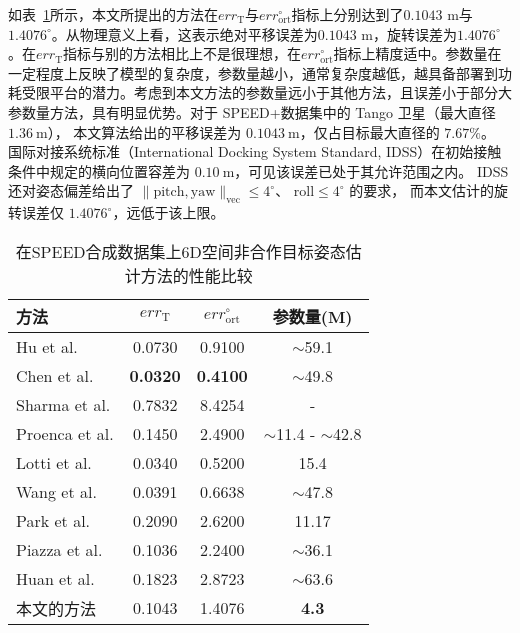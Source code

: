 如表~\ref{tab:SPEED_Comparison}所示，本文所提出的方法在$err_{\text{T}}$与$err_{\text{ort}}^{\circ}$指标上分别达到了$0.1043 \text{ m}$与$1.4076^{\circ}$。从物理意义上看，这表示绝对平移误差为$0.1043 \text{ m}$，旋转误差为$1.4076^{\circ}$。在$err_{\text{T}}$指标与别的方法相比上不是很理想，在$err_{\text{ort}}^{\circ}$指标上精度适中。参数量在一定程度上反映了模型的复杂度，参数量越小，通常复杂度越低，越具备部署到功耗受限平台的潜力。考虑到本文方法的参数量远小于其他方法，且误差小于部分大参数量方法，具有明显优势。对于 SPEED+数据集中的 Tango 卫星（最大直径 $1.36\ \text{m}$），
本文算法给出的平移误差为 $0.1043\ \text{m}$，仅占目标最大直径的 $7.67\%$。
国际对接系统标准（International Docking System Standard, IDSS）\cite{IDSS_IDD_RevF_2022}在初始接触条件中规定的横向位置容差为
$0.10\ \text{m}$，可见该误差已处于其允许范围之内。
IDSS 还对姿态偏差给出了
$\lVert\text{pitch},\text{yaw}\rVert_{\text{vec}} \le 4^{\circ}$、
$\text{roll} \le 4^{\circ}$ 的要求\cite{IDSS_IDD_RevF_2022}，
而本文估计的旋转误差仅 $1.4076^{\circ}$，远低于该上限。

\begin{table}[htbp]
	\centering
	\caption{在SPEED合成数据集上6D空间非合作目标姿态估计方法的性能比较}
	\label{tab:SPEED_Comparison}
	\begin{tabular}{lccc}
		\toprule
		方法 & $err_{\text{T}}$ & $err_{\text{ort}}^{\circ}$ & 参数量(M) \\
		\midrule
		Hu et al.\citep{gerard2019segmentation} & 0.0730 & 0.9100 & $\sim$59.1 \\
		Chen et al.\citep{chen2019satellite} & \textbf{0.0320} & \textbf{0.4100} & $\sim$49.8 \\
		Sharma et al.\citep{sharma2019pose}    & 0.7832 & 8.4254 & - \\
		Proenca et al.\citep{9197244} & 0.1450 & 2.4900 & $\sim$11.4 - $\sim$42.8\\
		Lotti et al.\citep{lotti2022investigating} & 0.0340 & 0.5200 & 15.4 \\
		Wang et al.\citep{wang2022revisiting} & 0.0391 & 0.6638 & $\sim$47.8 \\
		Park et al.\citep{park2019towards} & 0.2090 & 2.6200 & 11.17 \\
		Piazza et al.\citep{piazza2021deep} & 0.1036 & 2.2400 & $\sim$36.1 \\
		Huan et al.\citep{huan2020pose} & 0.1823 & 2.8723 & $\sim$63.6 \\
		本文的方法 & 0.1043 & 1.4076 & \textbf{4.3} \\
		\bottomrule
	\end{tabular}
\end{table}

